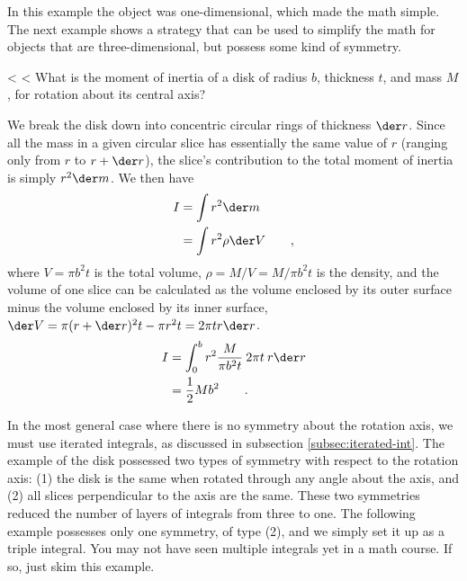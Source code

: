 In this example the object was one-dimensional, which made
the math simple. The next example shows a strategy that can
be used to simplify the math for objects that are
three-dimensional, but possess some kind of symmetry.

<%
<%
What is the moment of inertia of a disk of radius
$b$, thickness $t$, and mass $M$, for rotation about its central
axis?

We break the disk down into concentric circular
rings  of thickness $\der r$. Since all the mass in a given
circular slice has essentially the same value of $r$ (ranging
only from $r$ to $r+\der r$), the slice's contribution to the total
moment of inertia is simply $r^2\der m$. We then have
\begin{align*}
        I        &= \int r^2 \der m \\
                &= \int r^2 \rho\der V    \qquad ,
\end{align*}
where $V=\pi b^2 t$ is the total volume, $\rho=M/V=M/\pi b^2 t$ is the
density, and the volume of one
slice can be calculated as the volume enclosed by its outer
surface minus the volume enclosed by its inner surface,
$\der V= \pi (r+\der r)^2 t - \pi r^2 t = 2\pi tr \der r$.
\begin{align*}
        I        &=  \int_0^b r^2 \frac{M}{\pi b^2 t}\:2\pi t\:r\der r\\
                &=  \frac{1}{2}Mb^2 \qquad .
\end{align*}

In the most general case where there is no symmetry about
the rotation axis, we must use iterated integrals, as discussed
in subsection \ref{subsec:iterated-int}. The
example of the disk possessed two types of symmetry with
respect to the rotation axis: (1) the disk is the same when
rotated through any angle about the axis, and (2) all slices
perpendicular to the axis are the same. These two symmetries
reduced the number of layers of integrals from three to one.
The following example possesses only one symmetry, of type
(2), and we simply set it up as a triple integral. You may not
have seen multiple integrals yet in a math course. If so, just
skim this example.

